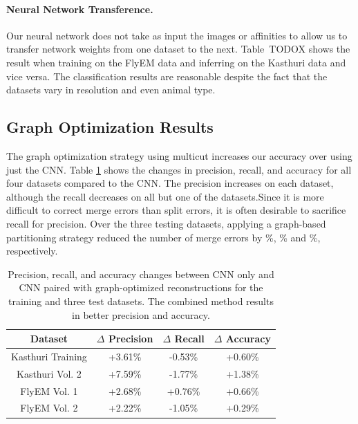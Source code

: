 \paragraph{Neural Network Transference.}

Our neural network does not take as input the images or affinities to allow us to transfer network weights from one dataset to the next.
Table~TODO{X} shows the result when training on the FlyEM data and inferring on the Kasthuri data and vice versa.
The classification results are reasonable despite the fact that the datasets vary in resolution and even animal type.


\subsection{Graph Optimization Results}

The graph optimization strategy using multicut increases our accuracy over using just the CNN.
Table \ref{table:multicut} shows the changes in precision, recall, and accuracy for all four datasets compared to the CNN.
The precision increases on each dataset, although the recall decreases on all but one of the datasets.Since it is more difficult to correct merge errors than split errors, it is often desirable to sacrifice recall for precision.
Over the three testing datasets, applying a graph-based partitioning strategy reduced the number of merge errors by \%, \% and \%, respectively. 

\begin{table}[h]
	\centering
	\small
	\begin{tabular}{c c c c} \hline
		\textbf{Dataset} & $\Delta$ \textbf{Precision} & $\Delta$ \textbf{Recall} & $\Delta$ \textbf{Accuracy} \\ \hline
		Kasthuri Training & +3.61\% & -0.53\% & +0.60\% \\
		Kasthuri Vol. 2 & +7.59\% & -1.77\% & +1.38\% \\
		FlyEM Vol. 1 & +2.68\% & +0.76\% & +0.66\% \\
		FlyEM Vol. 2 & +2.22\% & -1.05\% & +0.29\% \\ \hline
	\end{tabular}
	\caption{Precision, recall, and accuracy changes between CNN only and CNN paired with graph-optimized reconstructions for the training and three test datasets. The combined method results in better precision and accuracy.}
	\label{table:multicut}
\end{table}


